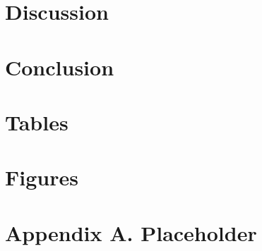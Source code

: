 \documentclass[12pt,a4paper]{article}
\begin{document}
\section{Discussion}


\section{Conclusion}



\singlespacing
\printbibliography



\clearpage

\onehalfspacing

\section*{Tables} \label{sec:tab}



\clearpage

\section*{Figures} \label{sec:fig}




\clearpage

\section*{Appendix A. Placeholder} \label{sec:appendixa}
\end{document}
